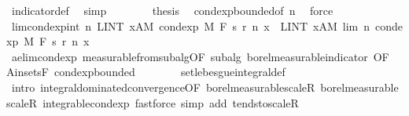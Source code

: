 \begin{isabellebody}
\ indicator{\isacharunderscore}{\kern0pt}def\ \isamarkupfalse%
\ simp\isanewline
\ \ \ \ \ \ \isamarkupfalse%
\ {\isacharquery}{\kern0pt}thesis\ \isamarkupfalse%
\ cond{\isacharunderscore}{\kern0pt}exp{\isacharunderscore}{\kern0pt}bounded{\isacharbrackleft}{\kern0pt}of\ n{\isacharbrackright}{\kern0pt}\ \isamarkupfalse%
\ force\isanewline
\ \ \ \ \isamarkupfalse%
\isanewline
\ \ \ \ \isamarkupfalse%
\ lim{\isacharunderscore}{\kern0pt}cond{\isacharunderscore}{\kern0pt}exp{\isacharunderscore}{\kern0pt}int{\isacharcolon}{\kern0pt}\ {\isachardoublequoteopen}{\isacharparenleft}{\kern0pt}{\isasymlambda}n{\isachardot}{\kern0pt}\ LINT\ x{\isacharcolon}{\kern0pt}A{\isacharbar}{\kern0pt}M{\isachardot}{\kern0pt}\ cond{\isacharunderscore}{\kern0pt}exp\ M\ F\ {\isacharparenleft}{\kern0pt}s\ {\isacharparenleft}{\kern0pt}r\ n{\isacharparenright}{\kern0pt}{\isacharparenright}{\kern0pt}\ x{\isacharparenright}{\kern0pt}\ {\isasymlonglonglongrightarrow}\ LINT\ x{\isacharcolon}{\kern0pt}A{\isacharbar}{\kern0pt}M{\isachardot}{\kern0pt}\ lim\ {\isacharparenleft}{\kern0pt}{\isasymlambda}n{\isachardot}{\kern0pt}\ cond{\isacharunderscore}{\kern0pt}exp\ M\ F\ {\isacharparenleft}{\kern0pt}s\ {\isacharparenleft}{\kern0pt}r\ n{\isacharparenright}{\kern0pt}{\isacharparenright}{\kern0pt}\ x{\isacharparenright}{\kern0pt}{\isachardoublequoteclose}\ \isanewline
\ \ \ \ \ \ \isamarkupfalse%
\ ae{\isacharunderscore}{\kern0pt}lim{\isacharunderscore}{\kern0pt}cond{\isacharunderscore}{\kern0pt}exp\ measurable{\isacharunderscore}{\kern0pt}from{\isacharunderscore}{\kern0pt}subalg{\isacharbrackleft}{\kern0pt}OF\ subalg\ borel{\isacharunderscore}{\kern0pt}measurable{\isacharunderscore}{\kern0pt}indicator{\isacharcomma}{\kern0pt}\ OF\ A{\isacharunderscore}{\kern0pt}in{\isacharunderscore}{\kern0pt}sets{\isacharunderscore}{\kern0pt}F{\isacharbrackright}{\kern0pt}\ cond{\isacharunderscore}{\kern0pt}exp{\isacharunderscore}{\kern0pt}bounded\isanewline
\ \ \ \ \ \ \isamarkupfalse%
\ set{\isacharunderscore}{\kern0pt}lebesgue{\isacharunderscore}{\kern0pt}integral{\isacharunderscore}{\kern0pt}def\isanewline
\ \ \ \ \ \ \isamarkupfalse%
\ {\isacharparenleft}{\kern0pt}intro\ integral{\isacharunderscore}{\kern0pt}dominated{\isacharunderscore}{\kern0pt}convergence{\isacharbrackleft}{\kern0pt}OF\ borel{\isacharunderscore}{\kern0pt}measurable{\isacharunderscore}{\kern0pt}scaleR\ borel{\isacharunderscore}{\kern0pt}measurable{\isacharunderscore}{\kern0pt}scaleR\ integrable{\isacharunderscore}{\kern0pt}cond{\isacharunderscore}{\kern0pt}exp{\isacharbrackright}{\kern0pt}{\isacharparenright}{\kern0pt}\ {\isacharparenleft}{\kern0pt}fastforce\ simp\ add{\isacharcolon}{\kern0pt}\ tendsto{\isacharunderscore}{\kern0pt}scaleR{\isacharparenright}{\kern0pt}{\isacharplus}{\kern0pt}\isanewline

\end{isabellebody}
